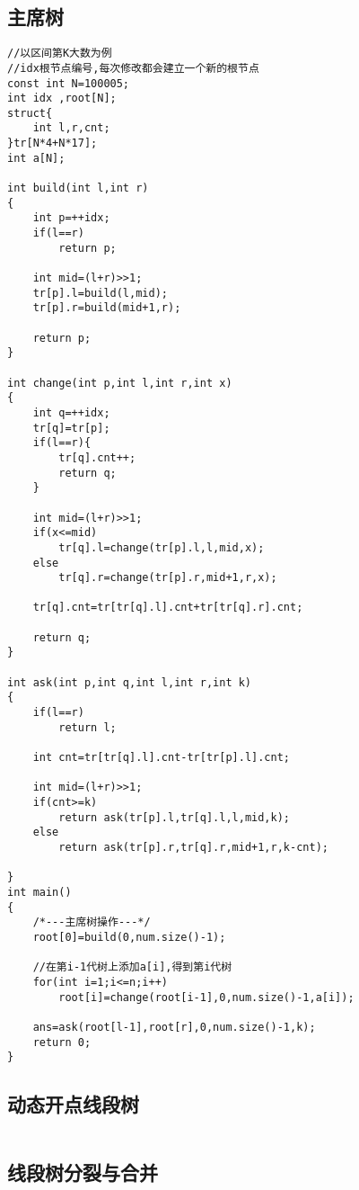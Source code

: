 \documentclass[twocolumn,a4]{article}
\begin{document}
\subsection{主席树}
\begin{lstlisting}
//以区间第K大数为例
//idx根节点编号,每次修改都会建立一个新的根节点
const int N=100005;
int idx ,root[N];
struct{
    int l,r,cnt;
}tr[N*4+N*17];
int a[N];

int build(int l,int r)
{
    int p=++idx;
    if(l==r)
        return p;
        
    int mid=(l+r)>>1;
    tr[p].l=build(l,mid);
    tr[p].r=build(mid+1,r);
    
    return p;
}

int change(int p,int l,int r,int x)
{
    int q=++idx;
    tr[q]=tr[p];
    if(l==r){
        tr[q].cnt++;
        return q;
    }
    
    int mid=(l+r)>>1;
    if(x<=mid)
        tr[q].l=change(tr[p].l,l,mid,x);
    else
        tr[q].r=change(tr[p].r,mid+1,r,x);
    
    tr[q].cnt=tr[tr[q].l].cnt+tr[tr[q].r].cnt;

    return q;
}

int ask(int p,int q,int l,int r,int k)
{
    if(l==r)
        return l;
    
    int cnt=tr[tr[q].l].cnt-tr[tr[p].l].cnt;
    
    int mid=(l+r)>>1;
    if(cnt>=k)
        return ask(tr[p].l,tr[q].l,l,mid,k);
    else
        return ask(tr[p].r,tr[q].r,mid+1,r,k-cnt);
    
}
int main()
{
    /*---主席树操作---*/
    root[0]=build(0,num.size()-1);

    //在第i-1代树上添加a[i],得到第i代树
    for(int i=1;i<=n;i++)
        root[i]=change(root[i-1],0,num.size()-1,a[i]);

    ans=ask(root[l-1],root[r],0,num.size()-1,k);
    return 0;
}
\end{lstlisting}

\subsection{动态开点线段树}
\begin{lstlisting}

\end{lstlisting}

\subsection{线段树分裂与合并}
\begin{lstlisting}

\end{lstlisting}
\end{document}
